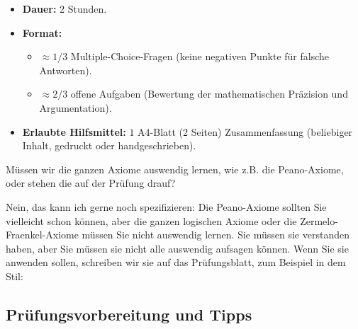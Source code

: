 \begin{math-stroke}
\begin{itemize}
    \item \textbf{Dauer:} $2$ Stunden.
    \item \textbf{Format:}
    \begin{itemize}
        \item $\approx 1/3$ Multiple-Choice-Fragen (keine negativen Punkte für falsche Antworten).
        \item $\approx 2/3$ offene Aufgaben (Bewertung der mathematischen Präzision und Argumentation).
    \end{itemize}
    \item \textbf{Erlaubte Hilfsmittel:} $1$ A4-Blatt ($2$ Seiten) Zusammenfassung (beliebiger Inhalt, gedruckt oder handgeschrieben).
\end{itemize}
\end{math-stroke}

\begin{student-interaction}[Studentenfrage]
Müssen wir die ganzen Axiome auswendig lernen, wie z.B. die Peano-Axiome, oder stehen die auf der Prüfung drauf?
\end{student-interaction}

\begin{spoken-clean}[01:23:49 - 01:24:19]
Nein, das kann ich gerne noch spezifizieren: Die Peano-Axiome sollten Sie vielleicht schon können, aber die ganzen logischen Axiome oder die Zermelo-Fraenkel-Axiome müssen Sie nicht auswendig lernen. Sie müssen sie verstanden haben, aber Sie müssen sie nicht alle auswendig aufsagen können. Wenn Sie sie anwenden sollen, schreiben wir sie auf das Prüfungsblatt, zum Beispiel in dem Stil: 
\end{spoken-clean}

\subsection{Prüfungsvorbereitung und Tipps}

